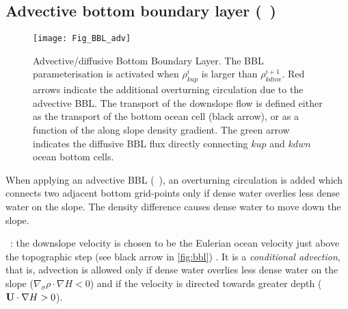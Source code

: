 \documentclass[../main/NEMO_manual]{subfiles}
\begin{document}
\subsection{Advective bottom boundary layer  (\protect{}~)}
\label{subsec:TRA_bbl_adv}


\begin{figure}[!t]
  \begin{center}
    \texttt{[image: Fig\_BBL\_adv]}
    \caption{
      \protect\label{fig:bbl}
      Advective/diffusive Bottom Boundary Layer.
      The BBL parameterisation is activated when $\rho^i_{kup}$ is larger than $\rho^{i + 1}_{kdnw}$.
      Red arrows indicate the additional overturning circulation due to the advective BBL.
      The transport of the downslope flow is defined either as the transport of the bottom ocean cell (black arrow),
      or as a function of the along slope density gradient.
      The green arrow indicates the diffusive BBL flux directly connecting $kup$ and $kdwn$ ocean bottom cells.
    }
  \end{center}
\end{figure}



When applying an advective BBL (~), an overturning circulation is added which
connects two adjacent bottom grid-points only if dense water overlies less dense water on the slope.
The density difference causes dense water to move down the slope.

~:
the downslope velocity is chosen to be the Eulerian ocean velocity just above the topographic step
(see black arrow in \autoref{fig:bbl}) \citep{Beckmann_Doscher1997}.
It is a \textit{conditional advection}, that is, advection is allowed only
if dense water overlies less dense water on the slope (\ie $\nabla_\sigma \rho \cdot \nabla H < 0$) and
if the velocity is directed towards greater depth (\ie $\mathbf{U} \cdot \nabla H > 0$).
\end{document}
